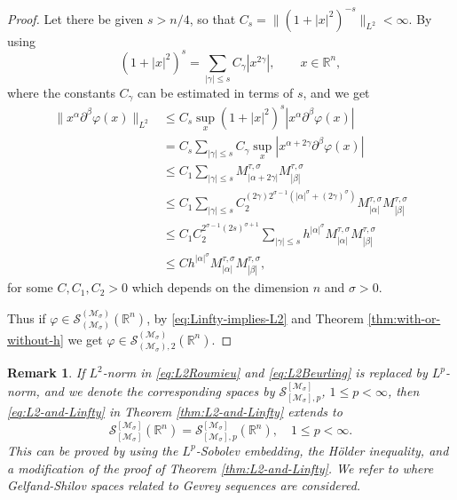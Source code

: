 \documentclass{article}
\theoremstyle{thmstyleone}
\theoremstyle{thmstyletwo}%
\newtheorem{Remark}[Theorem]{Remark}%
\theoremstyle{thmstylethree}%
\begin{document}
\begin{proof}
Let there be given $s > n/4$, so that $ C_s = \| (1+|x|^2)^{-s} \|_{L^2} <\infty$. By using
$$
(1+|x|^2)^{s} = \sum_{|\gamma| \leq s} 
C_\gamma | x^{2\gamma} |, \qquad x \in \mathbb R^n,
$$
where the constants $C_\gamma$ can be estimated in terms of $s$, and we get
\begin{align}
\| x^{\alpha } \partial ^{\beta }  \varphi(x)\|_{L^2} 
& \leq C_s  \sup_{x} (1+|x|^2)^{s} |x^\alpha \partial^\beta \varphi(x)| \nonumber \\
& = C_s  \sum_{|\gamma| \leq s} 
C_\gamma  \sup_{x} | x^{\alpha + 2\gamma} \partial^\beta \varphi(x)| 
\nonumber \\
& \leq C_1  \sum_{|\gamma| \leq s} 
 M^{\tau,\sigma}_{|\alpha + 2\gamma|}   M^{\tau,\sigma}_{|\beta|} \nonumber \\
& \leq C_1  \sum_{|\gamma| \leq s} C_2 ^{(2\gamma) 2^{\sigma - 1}(|\alpha |^\sigma + (2\gamma) ^\sigma)}
M^{\tau,\sigma}_{|\alpha |}   M^{\tau,\sigma}_{|\beta|} 
\nonumber \\
& \leq C_1  C_2 ^{ 2^{\sigma - 1}(2s) ^{\sigma+1}}
\sum_{|\gamma| \leq s} h^{|\alpha |^\sigma }
M^{\tau,\sigma}_{|\alpha |}   M^{\tau,\sigma}_{|\beta|}  
\nonumber \\
& \leq C
h^{|\alpha |^\sigma }
M^{\tau,\sigma}_{|\alpha |}   M^{\tau,\sigma}_{|\beta|},
\label{eq:Linfty-implies-L2}
\end{align}
for some $C, C_1, C_2 >0$ which depends on the dimension $n$ and $\sigma>0$.

Thus if 
$\varphi \in 
\mathcal S_{(\mathcal{M}_\sigma ) }^{ (\mathcal{M}_\sigma)} (\mathbb R^n)$, 
by \eqref{eq:Linfty-implies-L2} and  Theorem \ref{thm:with-or-without-h} we get
$\varphi \in \mathcal S_{(\mathcal{M}_\sigma ),2 }^{ (\mathcal{M}_\sigma)} (\mathbb R^n)$.
\end{proof}

\begin{Remark}  \label{rem:Lp-and-Linfty}
If $L^2$-norm in \eqref{eq:L2Roumieu} and \eqref{eq:L2Beurling} 
is replaced by $L^p$-norm, and we denote the corresponding 
spaces by $\mathcal S_{[\mathcal{M}_\sigma],p}^{[\mathcal{M}_\sigma]} $, $ 1\leq p < \infty$, then 
\eqref{eq:L2-and-Linfty} in Theorem \ref{thm:L2-and-Linfty}
extends to
\begin{equation}
\mathcal S_{[\mathcal{M}_\sigma ] }^{ [\mathcal{M}_\sigma]} (\mathbb R^n)
=  \mathcal S_{[\mathcal{M}_\sigma],p}^{[\mathcal{M}_\sigma]} (\mathbb R^n), \quad 1\leq p < \infty.    \label{eq:Lp-and-Linfty}
\end{equation}
This can be proved by using the $L^p$-Sobolev embedding, the H\"older inequality, and a modification of  the proof of Theorem \ref{thm:L2-and-Linfty}. We refer to \cite{Pil89} where Gelfand-Shilov spaces related to Gevrey sequences are considered.
\end{Remark}
\end{document}
